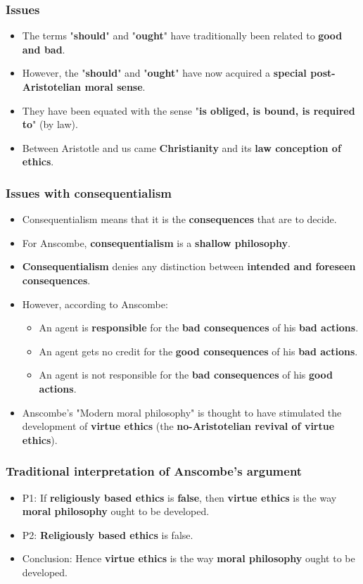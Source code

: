 \documentclass[11pt]{article}
\begin{document}
\subsubsection{Issues}
\label{sec:orga34a349}
\begin{itemize}
\item The terms "\textbf{should}" and "\textbf{ought}" have traditionally been related to \textbf{good and bad}.
\item However, the "\textbf{should}" and "\textbf{ought}" have now acquired a \textbf{special post-Aristotelian moral sense}.
\item They have been equated with the sense "\textbf{is obliged, is bound, is required to}" (by law).
\item Between Aristotle and us came \textbf{Christianity} and its \textbf{law conception of ethics}.
\end{itemize}

 \newpage
\subsubsection{Issues with consequentialism}
\label{sec:orgb783db3}
\begin{itemize}
\item Consequentialism means that it is the \textbf{consequences} that are to decide.
\item For Anscombe, \textbf{consequentialism} is a \textbf{shallow philosophy}.
\item \textbf{Consequentialism} denies any distinction between \textbf{intended and foreseen consequences}.
\item However, according to Anscombe:
\begin{itemize}
\item An agent is \textbf{responsible} for the \textbf{bad consequences} of his \textbf{bad actions}.
\item An agent gets no credit for the \textbf{good consequences} of his \textbf{bad actions}.
\item An agent is not responsible for the \textbf{bad consequences} of his \textbf{good actions}.
\end{itemize}
\item Anscombe's "Modern moral philosophy" is thought to have stimulated the development of \textbf{virtue ethics} (the \textbf{no-Aristotelian revival of virtue ethics}).
\end{itemize}
\subsubsection{Traditional interpretation of Anscombe's argument}
\label{sec:orga690823}
\begin{itemize}
\item P1: If \textbf{religiously based ethics} is \textbf{false}, then \textbf{virtue ethics} is the way \textbf{moral philosophy} ought to be developed.
\item P2: \textbf{Religiously based ethics} is false.
\item Conclusion: Hence \textbf{virtue ethics} is the way \textbf{moral philosophy} ought to be developed.
\end{itemize}
\end{document}
